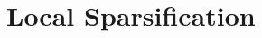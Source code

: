 \documentclass{patmorin}
\newcommand{\david}[1]{{\color{orange} David: #1}}
\newcommand{\pat}[1]{\textcolor{Blue}{Pat: #1}}
\begin{document}


%
%




\section{Local Sparsification}
\label{local_sparsification_section}
\end{document}
